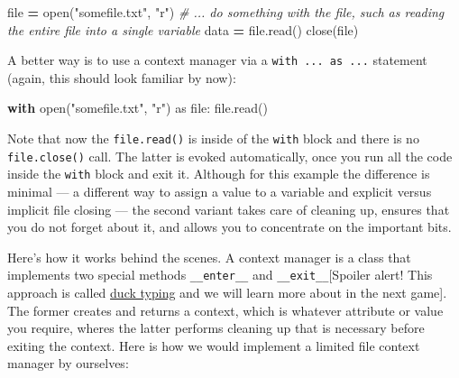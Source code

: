\documentclass[
]{book}
\newenvironment{Shaded}{\begin{snugshade}}{\end{snugshade}}
\newcommand{\BuiltInTok}[1]{#1}
\newcommand{\CommentTok}[1]{\textcolor[rgb]{0.56,0.35,0.01}{\textit{#1}}}
\newcommand{\ControlFlowTok}[1]{\textcolor[rgb]{0.13,0.29,0.53}{\textbf{#1}}}
\newcommand{\ImportTok}[1]{#1}
\newcommand{\NormalTok}[1]{#1}
\newcommand{\OperatorTok}[1]{\textcolor[rgb]{0.81,0.36,0.00}{\textbf{#1}}}
\newcommand{\StringTok}[1]{\textcolor[rgb]{0.31,0.60,0.02}{#1}}
\begin{document}
\begin{Shaded}
\begin{Highlighting}[]
\BuiltInTok{file} \OperatorTok{=} \BuiltInTok{open}\NormalTok{(}\StringTok{"somefile.txt"}\NormalTok{, }\StringTok{"r"}\NormalTok{)}
\CommentTok{\# ... do something with the file, such as reading the entire file into a single variable}
\NormalTok{data }\OperatorTok{=} \BuiltInTok{file}\NormalTok{.read()}
\NormalTok{close(}\BuiltInTok{file}\NormalTok{)}
\end{Highlighting}
\end{Shaded}

A better way is to use a context manager via a \texttt{with\ ...\ as\ ...} statement (again, this should look familiar by now):

\begin{Shaded}
\begin{Highlighting}[]
\ControlFlowTok{with} \BuiltInTok{open}\NormalTok{(}\StringTok{"somefile.txt"}\NormalTok{, }\StringTok{"r"}\NormalTok{) }\ImportTok{as} \BuiltInTok{file}\NormalTok{:}
    \BuiltInTok{file}\NormalTok{.read()}
\end{Highlighting}
\end{Shaded}

Note that now the \texttt{file.read()} is inside of the \texttt{with} block and there is no \texttt{file.close()} call. The latter is evoked automatically, once you run all the code inside the \texttt{with} block and exit it. Although for this example the difference is minimal --- a different way to assign a value to a variable and explicit versus implicit file closing --- the second variant takes care of cleaning up, ensures that you do not forget about it, and allows you to concentrate on the important bits.

Here's how it works behind the scenes. A context manager is a class that implements two special methods \texttt{\_\_enter\_\_} and \texttt{\_\_exit\_\_}{[}Spoiler alert! This approach is called \href{duck-typing}{duck typing} and we will learn more about in the next game{]}. The former creates and returns a context, which is whatever attribute or value you require, wheres the latter performs cleaning up that is necessary before exiting the context. Here is how we would implement a limited file context manager by ourselves:
\end{document}

